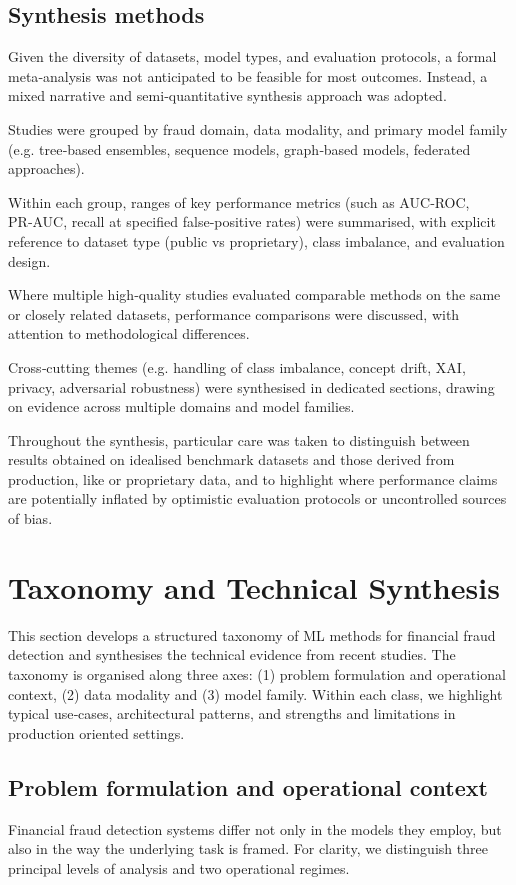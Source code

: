 \documentclass[a4paper,fleqn]{cas-dc}
\begin{document}
\subsection{Synthesis methods}
Given the diversity of datasets, model types, and evaluation protocols, a formal meta‑analysis was not anticipated to be feasible for most outcomes. 
Instead, a mixed narrative and semi‑quantitative synthesis approach was adopted.

Studies were grouped by fraud domain, data modality, and primary model family (e.g. tree‑based ensembles, sequence models, graph‑based models, federated approaches).

Within each group, ranges of key performance metrics (such as AUC‑ROC, PR‑AUC, recall at specified false‑positive rates) were summarised, with explicit reference to dataset type (public vs proprietary), class imbalance, and evaluation design.

Where multiple high‑quality studies evaluated comparable methods on the same or closely related datasets, performance comparisons were discussed, with attention to methodological differences.

Cross‑cutting themes (e.g. handling of class imbalance, concept drift, XAI, privacy, adversarial robustness) were synthesised in dedicated sections, drawing on evidence across multiple domains and model families.

Throughout the synthesis, particular care was taken to distinguish between results obtained on idealised benchmark datasets and those derived from production, like or proprietary data, and to highlight where performance claims are potentially inflated by optimistic evaluation protocols or uncontrolled sources of bias.

\section{Taxonomy and Technical Synthesis}
This section develops a structured taxonomy of ML methods for financial fraud detection and synthesises the technical evidence from recent studies. 
The taxonomy is organised along three axes: (1) problem formulation and operational context, (2) data modality and (3) model family. 
Within each class, we highlight typical use‑cases, architectural patterns, and strengths and limitations in production oriented settings.

\subsection{Problem formulation and operational context}
Financial fraud detection systems differ not only in the models they employ, but also in the way the underlying task is framed. 
For clarity, we distinguish three principal levels of analysis and two operational regimes.
\end{document}
